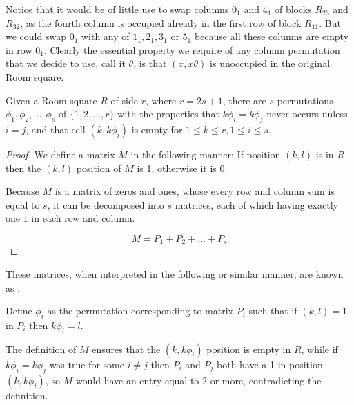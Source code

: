 Notice that it would be of little use to swap columns $0_1$ and $4_1$ of blocks $R_{23}$ and $R_{32}$, as the fourth column is occupied already in the first row of block $R_{11}$.
But we could swap $0_1$ with any of $1_1,2_1,3_1$ or $5_1$ because all these columns are empty in row $0_1$.
Clearly the essential property we require of any column permutation that we decide to use, call it $\theta$, is that $(x,x\theta)$ is unoccupied in the original Room square.

\begin{lemma}
\label{lem:permute}
Given a Room square $R$ of side $r$, where $r=2s+1$, there are $s$ permutations $\phi_1,\phi_2,...,\phi_s$ of $\{1,2,...,r\}$ with the properties that $k\phi_i=k\phi_j$ never occurs unless $i=j$, and that cell $(k,k\phi_i)$ is empty for $1 \leq k \leq r, 1 \leq i\leq s$.
\end{lemma}

\begin{proof}
We define a matrix $M$ in the following manner: If position $(k,l)$ is  in $R$ then the $(k,l)$ position of $M$ is 1, otherwise it is 0.

Because $M$ is a matrix of zeros and ones, whose every row and column sum is equal to $s$, it can be decomposed into $s$ matrices, each of which having exactly one $1$ in each row and column.

\begin{equation}
M = P_1 + P_2 + \ldots + P_s
\end{equation}
\end{proof}

These matrices, when interpreted in the following or similar manner, are known as .

Define $\phi_i$ as the permutation corresponding to matrix $P_i$ such that if $(k,l) = 1$ in $P_i$ then $k\phi _i = l$.

The definition of $M$ ensures that the $(k, k\phi _i)$ position is empty in $R$, while if $k\phi_{i} = k\phi_{j}$ was true for some $i \neq j$ then $P_i$ and $P_j$ both have a 1 in position $(k, k\phi_i)$, so $M$ would have an entry equal to 2 or more, contradicting the definition.


